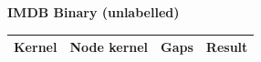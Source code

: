 \documentclass{article}
\begin{document}
\textbf{IMDB Binary (unlabelled)}\\
\begin{minipage}{0.6\linewidth}
	\hspace*{-1in}

	\label{fig:imdb_unlabelled}
\end{minipage}
\begin{minipage}[c]{0.5\linewidth}	
	\centering
	\begin{tabular}{c|c|c|c}
		Kernel & Node kernel & Gaps & Result\\
		\hline
	\end{tabular}
	\label{table:imdb_unlabelled}
\end{minipage}
\end{document}
